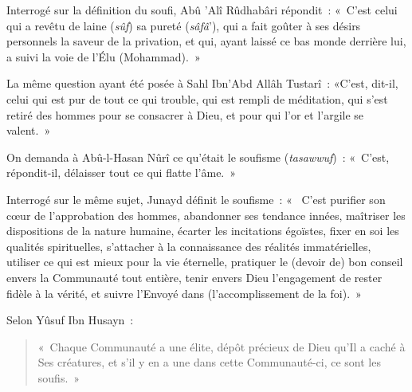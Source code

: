 Interrogé sur la définition du soufi, Abû 'Alî Rûdhabâri répondit~:
«~C'est celui qui a revêtu de laine (\emph{sûf}) sa pureté
(\emph{sâfâ}'), qui a fait goûter à ses désirs personnels la saveur de
la privation, et qui, ayant laissé ce bas monde derrière lui, a suivi la
voie de l'Élu (Mohammad).~»

La même question ayant été posée à Sahl Ibn'Abd Allâh Tustarî~: «C'est,
dit-il, celui qui est pur de tout ce qui trouble, qui est rempli de
méditation, qui s'est retiré des hommes pour se consacrer à Dieu, et
pour qui l'or et l'argile se valent.~»

On demanda à Abû-l-Hasan Nûrî ce qu'était le soufisme
(\emph{tasawwuf})~: «~C'est, répondit-il, délaisser tout ce qui flatte
l'âme.~»

Interrogé sur le même sujet, Junayd définit le soufisme~: «~ C'est
purifier son cœur de l'approbation des hommes, abandonner ses tendance
innées, maîtriser les dispositions de la nature humaine, écarter les
incitations égoïstes, fixer en soi les qualités spirituelles, s'attacher
à la connaissance des réalités immatérielles, utiliser ce qui est mieux
pour la vie éternelle, pratiquer le (devoir de) bon conseil envers la
Communauté tout entière, tenir envers Dieu l'engagement de rester fidèle
à la vérité, et suivre l'Envoyé dans (l'accomplissement de la foi).~»

Selon Yûsuf Ibn Husayn~: 
\begin{quote}
    «~Chaque Communauté a une élite, dépôt précieux
de Dieu qu'Il a caché à Ses créatures, et s'il y en a une dans cette
Communauté-ci, ce sont les soufis.~»
\end{quote}

